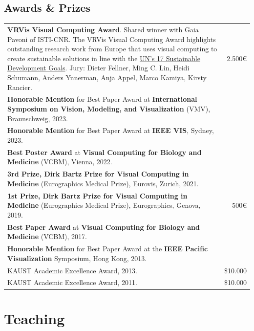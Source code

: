 \documentclass[10pt,a4paper,roman,final]{moderncv}
\begin{document}
\subsection*{Awards \& Prizes}
\vspace{-5mm}
\begin{tabularx}{\textwidth}{@{}X@{\hspace{2em}}r@{}}
\href{https://www.vrvis.at/en/news-events/awards/gaia-pavoni-and-thomas-hoellt-win-vrvis-visual-computing-award}{\textbf{VRVis Visual Computing Award}}. Shared winner with Gaia Pavoni of ISTI-CNR. The VRVis Visual Computing Award highlights outstanding research work from Europe that uses visual computing to create sustainable solutions in line with the \href{https://sdgs.un.org/goals}{UN’s 17 Sustainable Development Goals}. Jury: Dieter Fellner, Ming C. Lin, Heidi Schumann, Anders Ynnerman, Anja Appel, Marco Kamiya, Kirsty Rancier. & 2.500\euro{}\\
\textbf{Honorable Mention} for Best Paper Award at \textbf{International Symposium on Vision, Modeling, and Visualization} (VMV), Braunschweig, 2023. & \\
\textbf{Honorable Mention} for Best Paper Award at \textbf{IEEE VIS}, Sydney, 2023. & \\
\textbf{Best Poster Award} at \textbf{Visual Computing for Biology and Medicine} (VCBM), Vienna, 2022. & \\
\textbf{3rd Prize, Dirk Bartz Prize for Visual Computing in Medicine} (Eurographics Medical Prize), Eurovis, Zurich, 2021. & \\
\textbf{1st Prize, Dirk Bartz Prize for Visual Computing in Medicine} (Eurographics Medical Prize), Eurographics, Genova, 2019. & 500\euro{}\\
\textbf{Best Paper Award} at \textbf{Visual Computing for Biology and Medicine} (VCBM), 2017. & \\
\textbf{Honorable Mention} for Best Paper Award at the \textbf{IEEE Pacific Visualization} Symposium, Hong Kong, 2013. & \\
KAUST Academic Excellence Award, 2013. & \$10.000\\
KAUST Academic Excellence Award, 2011. & \$10.000\\
\end{tabularx}



\section*{Teaching}
\end{document}
